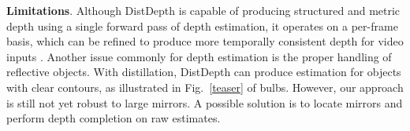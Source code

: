 \documentclass[10pt,twocolumn,letterpaper]{article}
\begin{document}
\textbf{Limitations}. Although DistDepth is capable of producing structured and metric depth using a single forward pass of depth estimation, it operates on a per-frame basis, which can be refined to produce more temporally consistent depth for video inputs \cite{luo2020consistent, Kopf_2021_CVPR}. Another issue commonly for depth estimation is the proper handling of reflective objects. With distillation, DistDepth can produce estimation for objects with clear contours, as illustrated in Fig.~\ref{teaser} of bulbs. However, our approach is still not yet robust to large mirrors. A possible solution is to locate mirrors and perform depth completion \cite{zhong2019deep, zhu2021rgb, wu2021scene, wong2021unsupervised} on raw estimates.

{\small


}
\end{document}
